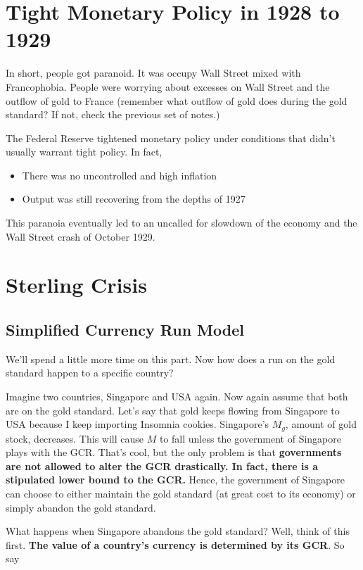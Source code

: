 \documentclass[11pt]{scrartcl}
\begin{document}
\section{Tight Monetary Policy in 1928 to 1929}

In short, people got paranoid. It was occupy Wall Street mixed with Francophobia. People were worrying about excesses on Wall Street and the outflow of gold to France (remember what outflow of gold does during the gold standard? If not, check the previous set of notes.)

The Federal Reserve tightened monetary policy under conditions that didn't usually warrant tight policy. In fact,

\begin{itemize}
\item There was no uncontrolled and high inflation
\item Output was still recovering from the depths of 1927
\end{itemize}

This paranoia eventually led to an uncalled for slowdown of the economy and the Wall Street crash of October 1929.

\section{Sterling Crisis}

\subsection{Simplified Currency Run Model}

We'll spend a little more time on this part. Now how does a run on the gold standard happen to a specific country? 

Imagine two countries, Singapore and USA again. Now again assume that both are on the gold standard. Let's say that gold keeps flowing from Singapore to USA because I keep importing Insomnia cookies. Singapore's $M_g$, amount of gold stock, decreases. This will cause $M$ to fall unless the government of Singapore plays with the GCR. That's cool, but the only problem is that \textbf{governments are not allowed to alter the GCR drastically. In fact, there is a stipulated lower bound to the GCR.} Hence, the government of Singapore can choose to either maintain the gold standard (at great cost to its economy) or simply abandon the gold standard. 

What happens when Singapore abandons the gold standard? Well, think of this first. \textbf{The value of a country's currency is determined by its GCR}. So say
\end{document}
